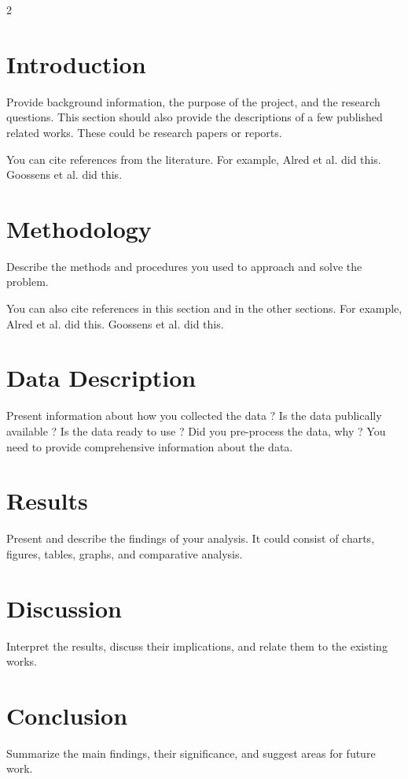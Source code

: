 \documentclass[12pt]{spieman}  %
\begin{document}
\begin{spacing}{2}   %

\section{Introduction}
\label{sect:intro}  

Provide background information, the purpose of the project, and the research questions. This section should also provide the descriptions of a few published related works. These could be research papers or reports.

You can cite references from the literature. For example, Alred et al. \cite{Alred03} did this. Goossens et al. \cite{Goossens97} did this.

\section{Methodology}

Describe the methods and procedures you used to approach and solve the problem. 

You can also cite references in this section and in the other sections. For example, Alred et al. \cite{Alred03} did this. Goossens et al. \cite{Goossens97} did this.


\section{Data Description}

Present information about how you collected the data ? Is the data publically available ? Is the data ready to use ? Did you pre-process the data, why ? You need to provide comprehensive information about the data.

\section{Results}

Present and describe the findings of your analysis. It could consist of charts, figures, tables, graphs, and comparative analysis.

\section{Discussion}

Interpret the results, discuss their implications, and relate them to the existing works.

\section{Conclusion}

Summarize the main findings, their significance, and suggest areas for future work.






\end{spacing}
\end{document}
